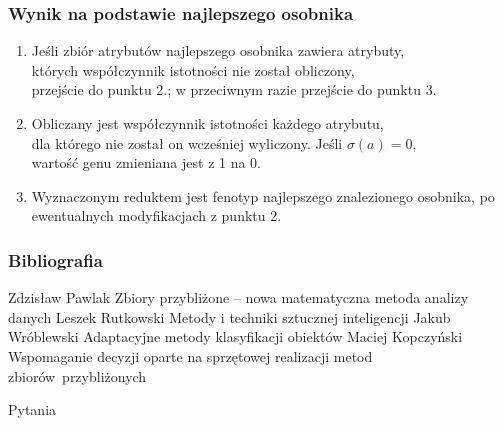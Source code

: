\documentclass[10pt]{beamer}
\begin{document}


\begin{frame}
\frametitle{Wynik na podstawie najlepszego osobnika}
\begin{spacing}{1.3}
\begin{flushleft}
\begin{enumerate}[1.]
\item Jeśli zbiór atrybutów najlepszego osobnika zawiera atrybuty,\\
których współczynnik istotności nie został obliczony,\\
przejście do punktu 2.; w przeciwnym razie przejście do punktu 3.
\item Obliczany jest współczynnik istotności każdego atrybutu,\\
dla którego nie został on wcześniej wyliczony. Jeśli $\sigma(a) = 0$,\\ wartość genu zmieniana jest z 1 na 0.
\item Wyznaczonym reduktem jest fenotyp najlepszego znalezionego osobnika, po ewentualnych modyfikacjach z punktu 2.
\end{enumerate}
\end{flushleft}
\end{spacing}

\end{frame}






\begin{frame}
\frametitle{Bibliografia}
\footnotesize
{
\begin{thebibliography}{99}
 Zdzisław Pawlak
\newblock Zbiory przybliżone -- nowa matematyczna metoda analizy danych 
 Leszek Rutkowski
\newblock Metody i techniki sztucznej inteligencji
 Jakub Wróblewski
\newblock Adaptacyjne metody klasyfikacji obiektów
 Maciej Kopczyński
\newblock Wspomaganie decyzji oparte na sprzętowej realizacji metod zbiorów~przybliżonych
\end{thebibliography}
}
\end{frame}


{\1
\begin{frame}
  \finalpage
  {
  \begin{huge}
  	Pytania
  \end{huge}
  
  }
\end{frame}
}
\end{document}
